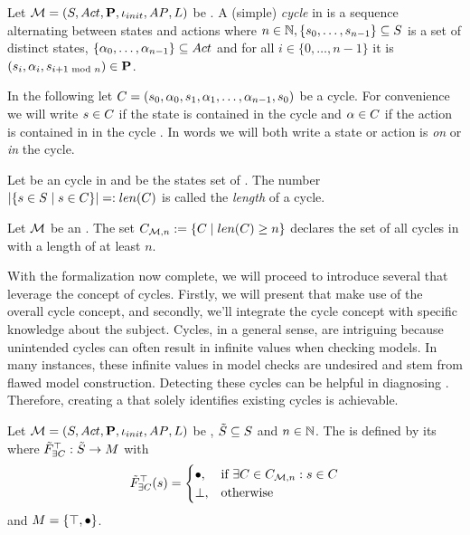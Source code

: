 \documentclass[preview]{standalone}
\begin{document}
\begin{definition}
	Let ${{{\mathcal{M}}}} = {{({S}, {Act}, {\textbf{P}}, {\iota_{init}}, {AP}, {L})}}$ be \achgphN. A (simple) \emph{cycle} \cycle in \chgph is a sequence \cyclesecfull alternating between states and actions where $n \in {\mathbb{N}}, \{{s}_0, \dots, {s}_{n-1}\} \subseteq {S}$ is a set of distinct states, $\{{\alpha}_0, \dots, {\alpha}_{n-1}\} \subseteq {Act}$ and for all $i \in \{0, \dots, n-1\}$ it is $({s}_i,{\alpha}_i, {s}_{i+1 \text{ mod }n}) \in {\ensuremath{{\textbf{P}}}}$.
\end{definition}

In the following let ${C} = {({s}_0, {\alpha}_0, {s}_1, {\alpha}_1, \dots, {\alpha}_{n-1}, {s}_0)}$ be a cycle. For convenience we will write ${s} \in {C}$ if the state is contained in the cycle \cycle and ${\alpha} \in {C}$ if the action is contained in in the cycle \cycle. In words we will both write a state or action is \emph{on} or \emph{in} the cycle.

\begin{definition}
	Let \cycle be an cycle in \chgph and \states be the states set of \chgph. The number $|\{{s} \in {S} \mid {s} \in {C}\}| =: {len}({C})$ is called the \emph{length} of a cycle. 
\end{definition}

\begin{definition}
	Let ${{{\mathcal{M}}}}$ be an \chgphN. The set ${{C}_{{{\mathcal{M}}}, n}} := \{ {C} \mid {len}({C}) \geq n\}$ declares the set of all cycles in \chgph with a length of at least $n$.
\end{definition}

With the formalization now complete, we will proceed to introduce several \viewsN that leverage the concept of cycles. Firstly, we will present \viewsN that make use of the overall cycle concept, and secondly, we'll integrate the cycle concept with specific knowledge about the subject. Cycles, in a general sense, are intriguing because unintended cycles can often result in infinite values when checking models. In many instances, these infinite values in model checks are undesired and stem from flawed model construction. Detecting these cycles can be helpful in diagnosing \achgphN. Therefore, creating a \viewN that solely identifies existing cycles is achievable.

\begin{definition}
	Let ${{{\mathcal{M}}}} = {{({S}, {Act}, {\textbf{P}}, {\iota_{init}}, {AP}, {L})}}$ be \achgphN, ${\tilde{{S}}} \subseteq {S}$ and $n \in {\mathbb{N}}$. The \viewN \viewhascycle is defined by its \grpfctN \gfcthascycle where ${{\tilde{F}_{{\exists{C}}}}^{\top}} : {\tilde{{S}}} \to {\ensuremath{{M}}}$ with
	\[
	\gfctsubhascycle(\state) =
	\begin{cases}
			\remelem, &\text{if } \exists \cycle \in \cycleset : \state \in \cycle \\
			\notppty, &\text{otherwise}
		\end{cases}
	\]
	and ${{M}} = \{{\top}, {\bullet}\}$.
\end{definition}
\end{document}
